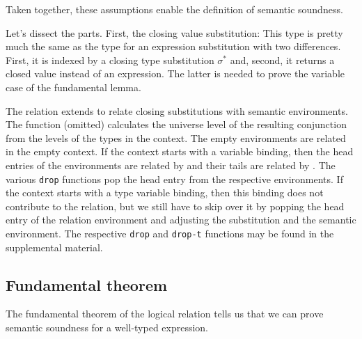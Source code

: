 \documentclass[acmsmall,anonymous,review,screen]{acmart}
\begin{document}
Taken together, these assumptions enable the definition of semantic soundness.
\FundamentalSemanticSoundness

Let's dissect the parts. First, the closing value substitution:
\LogicalCSub
This type is pretty much the same as the type for an expression
substitution with two differences. First, it is indexed by a closing
type substitution $\sigma^*$ and, second, it returns a closed value instead of an
expression. The latter is needed to prove the variable case of the
fundamental lemma.

The relation {\AGSem} extends {\AVSem} to relate closing substitutions
with semantic environments. The {\AlevelEnv} function (omitted) calculates the universe level
of the resulting conjunction from the levels of the types in the
context.
\LogicalMCG
The empty environments are related in the empty context.
If the context starts with a variable binding, then the head entries of
the environments are related by {\AVSem} and their tails are
related by {\AGSem}.
The various \texttt{drop} functions pop the head entry from the
respective environments.
If the context starts with a type variable binding, then this binding
does not contribute to the relation, but we still have to skip over it
by popping the head entry of the relation environment and adjusting the
substitution and the semantic environment.
The respective \texttt{drop} and \texttt{drop-t} functions may be
found in the supplemental material.

\subsection{Fundamental theorem}
\label{sec:fundamental}

The fundamental theorem of the logical relation tells us that we can
prove semantic soundness for a well-typed expression.
\FundamentalFundamentalType
\end{document}
